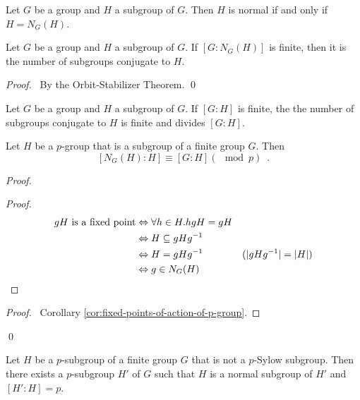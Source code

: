 \begin{cor}
\label{cor:normal-NG}
Let $G$ be a group and $H$ a subgroup of $G$. Then $H$ is normal if and only if $H = N_G(H)$.
\end{cor}

\begin{prop}
\label{prop:number-of-subgroup-conjugate-to-H}
Let $G$ be a group and $H$ a subgroup of $G$. If $[G:N_G(H)]$ is finite, then it is the number of subgroups conjugate to $H$.
\end{prop}

\begin{proof}
\pf\ By the Orbit-Stabilizer Theorem. \qed
\end{proof}

\begin{cor}
\label{cor:number-of-conjugates-divides-index}
Let $G$ be a group and $H$ a subgroup of $G$. If $[G:H]$ is finite, the the number of subgroups conjugate to $H$ is finite and divides $[G:H]$.
\end{cor}

\begin{lm}
\label{lm:index-of-H-in-NGH}
Let $H$ be a $p$-group that is a subgroup of a finite group $G$. Then
\[ [N_G(H) : H] \equiv [G:H] (\mod p) \enspace . \]
\end{lm}

\begin{proof}
\pf
{}
\begin{proof}
	\pf
	\begin{align*}
		gH \text{ is a fixed point}
		& \Leftrightarrow \forall h \in H. hgH = gH \\
		& \Leftrightarrow H \subseteq gH{g}^{-1} \\
		& \Leftrightarrow H = gH{g}^{-1} & (|gH{g}^{-1}| = |H|) \\
		& \Leftrightarrow g \in N_G(H)
	\end{align*}
\end{proof}
\qedstep
\begin{proof}
	\pf\ Corollary \ref{cor:fixed-points-of-action-of-p-group}.
\end{proof}
\qed
\end{proof}

\begin{prop}
Let $H$ be a $p$-subgroup of a finite group $G$ that is not a $p$-Sylow subgroup. Then there exists a $p$-subgroup $H'$ of $G$ such that $H$ is a normal subgroup of $H'$ and $[H':H] = p$.
\end{prop}

